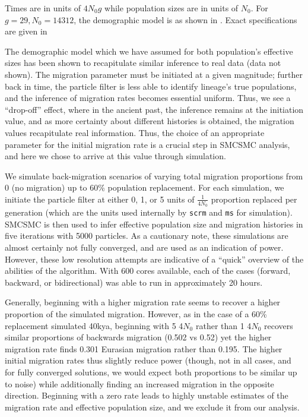 Times are in units of $4N_0g$ while population sizes are in units of $N_0$. For $g=29, N_0 = 14312$, the demographic model is as shown in .  Exact specifications are given in 

The demographic model which we have assumed for both population's effective sizes has been shown to recapitulate similar inference to real data (data not shown). The migration parameter must be initiated at a given magnitude; further back in time, the particle filter is less able to identify lineage's true populations, and the inference of migration rates becomes essential uniform. Thus, we see a ``drop-off'' effect, where in the ancient past, the inference remains at the initiation value, and as more certainty about different histories is obtained, the migration values recapitulate real information. Thus, the choice of an appropriate parameter for the initial migration rate is a crucial step in SMCSMC analysis, and here we chose to arrive at this value through simulation.

We simulate back-migration scenarios of varying total migration proportions from 0 (no migration) up to 60\% population replacement. For each simulation, we initiate the particle filter at either 0, 1, or 5 units of $\frac{1}{4 N_0}$ proportion replaced per generation (which are the units used internally by {\tt scrm} and {\tt ms} for simulation).  SMCSMC is then used to infer effective population size and migration histories in five iterations with 5000 particles. As a cautionary note, these simulations are almost certainly not fully converged, and are used as an indication of power. However, these low resolution attempts are indicative of a ``quick'' overview of the abilities of the algorithm. With 600 cores available, each of the cases (forward, backward, or bidirectional) was able to run in approximately 20 hours. 

Generally, beginning with a higher migration rate seems to recover a higher proportion of the simulated migration. However, as in the case of a 60\% replacement simulated 40kya, beginning with 5 4$N_0$ rather than 1 4$N_0$ recovers similar proportions of backwards migration (0.502 vs 0.52) yet the higher migration rate finds 0.301 Eurasian migration rather than 0.195. The higher initial migration rates thus slightly reduce power (though, not in all cases, and for fully converged solutions, we would expect both proportions to be similar up to noise) while additionally finding an increased migration in the opposite direction.  Beginning with a zero rate leads to highly unstable estimates of the migration rate and effective population size, and we exclude it from our analysis.




